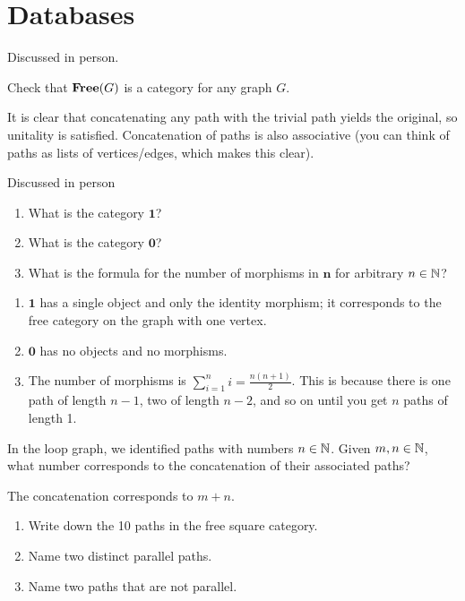 \chapter{Databases}

Discussed in person.

Check that $\textbf{Free}(G)$ is a category for any graph $G$.

\solution
It is clear that concatenating any path with the trivial path yields the original, so unitality is satisfied.  Concatenation of paths is also associative (you can think of paths as lists of vertices/edges, which makes this clear).

Discussed in person

\begin{enumerate}
	\item What is the category $\textbf{1}$?
	\item What is the category $\textbf{0}$?
	\item What is the formula for the number of morphisms in $\textbf{n}$ for arbitrary $n\in\mathbb{N}$?
\end{enumerate}

\solution
\begin{enumerate}
	\item $\textbf{1}$ has a single object and only the identity morphism; it corresponds to the free category on the graph with one vertex.
	\item $\textbf{0}$ has no objects and no morphisms.
	\item The number of morphisms is $\sum_{i=1}^n i = \frac{n(n+1)}{2}$.  This is because there is one path of length $n-1$, two of length $n-2$, and so on until you get $n$ paths of length 1.
\end{enumerate}

In the loop graph, we identified paths with numbers $n\in\mathbb{N}$.  Given $m,n\in\mathbb{N}$, what number corresponds to the concatenation of their associated paths?

\solution
The concatenation corresponds to $m+n$.

\begin{enumerate}
	\item Write down the 10 paths in the free square category.
	\item Name two distinct parallel paths.
	\item Name two paths that are not parallel.
\end{enumerate}

